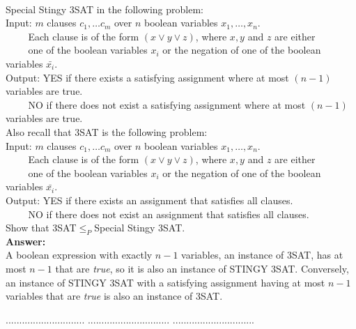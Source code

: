 \documentclass[a4paper,11pt]{article}
\begin{document}
\bigskip

\\
Special Stingy 3SAT in the following problem:\\
Input: $m$ clauses $c_1, \ldots c_m$ over $n$ boolean variables $x_1 , \ldots , x_n$.\\
$~~~~~~~~~$ Each clause is of the form $(x \vee y \vee z)$, where $x, y$ and $z$ are either \\
$~~~~~~~~~$ one of the boolean variables $x_i$ or the negation of one of the boolean variables $\bar{x_i}$.\\
Output: YES if there exists a satisfying assignment where at most $(n-1)$ variables are true.\\
$~~~~~~~~~$ NO if there does not exist a satisfying assignment where at most $(n-1)$ variables are true.\\
Also recall that 3SAT is the following problem:\\
Input: $m$ clauses $c_1, \ldots c_m$ over $n$ boolean variables $x_1 , \ldots , x_n$.\\
$~~~~~~~~~$ Each clause is of the form $(x \vee y \vee z)$, where $x, y$ and $z$ are either \\
$~~~~~~~~~$ one of the boolean variables $x_i$ or the negation of one of the boolean variables $\bar{x_i}$.\\
Output: YES if there exists an assignment that satisfies all clauses.\\
$~~~~~~~~~$ NO if there does not exist an assignment that satisfies all clauses.\\
Show that 3SAT$\leq_P$Special Stingy 3SAT. \\
{\bf Answer:}\\
A boolean expression with exactly $n - 1$ variables, an instance of 3SAT, has at most $n - 1$ that are \textit{true}, so it is also an instance of STINGY 3SAT. Conversely, an instance of STINGY 3SAT with a satisfying assignment having at most $n - 1$ variables that are \textit{true} is also an instance of 3SAT.

\pagebreak

 $.............................$
 $..............................$
          $..............................$\\

\bigskip
\end{document}
